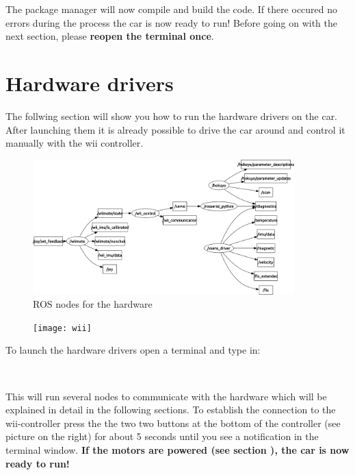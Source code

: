 {The package manager will now compile and build the code. If there occured no errors during the process the car is now ready to run! Before going on with the next section, please \textbf{reopen the terminal once}.

\newpage
\section{Hardware drivers}
\label{sec:tas_package_drivers}
The follwing section will show you how to run the hardware drivers on the car. After launching them it is already possible to drive the car around and control it manually with the wii controller.

\begin{figure}[h]
	\centering
		\includegraphics[width=0.9\textwidth]{diagrams/rqt_hardware}
	\caption{ROS nodes for the hardware}
	\label{fig:rqt_hardware}
\end{figure}

\begin{figure}
  \begin{center}
    \texttt{[image: wii]}
		\caption{}
		\label{fig:wii_controller}
  \end{center}	
\end{figure}

To launch the hardware drivers open a terminal and type in:

\\

This will run several nodes to communicate with the hardware which will be explained in detail in the following sections. To establish the connection to the wii-controller press the the two two buttons at the bottom of the controller (see picture  on the right) for about 5 seconds until you see a notification in the terminal window. \textbf{If the motors are powered (see section ), the car is now ready to run!}

}

